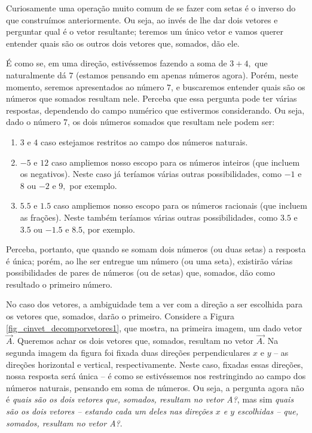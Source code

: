 Curiosamente uma operação muito comum de se fazer com setas é o inverso do que construímos anteriormente. Ou seja, ao invés de lhe dar dois vetores e perguntar qual é o vetor resultante; teremos um único vetor e vamos querer entender quais são os outros dois vetores que, somados, dão ele.

É como se, em uma direção, estivéssemos fazendo a soma de $3+4,$ que naturalmente dá $7$ (estamos pensando em apenas números agora). Porém, neste momento, seremos apresentados ao número $7$, e buscaremos entender quais são os números que somados resultam nele. Perceba que essa pergunta pode ter várias respostas, dependendo do campo numérico que estivermos considerando. Ou seja, dado o número $7$, os dois números somados que resultam nele podem ser:

\begin{enumerate}
    \item [(i)] $3$ e $4$ caso estejamos restritos ao campo dos números naturais.
    \item [(ii)] $-5$ e $12$ caso ampliemos nosso escopo para os números inteiros (que incluem os negativos). Neste caso já teríamos várias outras possibilidades, como $-1$ e $8$ ou $-2$ e $9,$ por exemplo.
    \item [(iii)] $5.5$ e $1.5$ caso ampliemos nosso escopo para os números racionais (que incluem as frações). Neste também teríamos várias outras possibilidades, como $3.5$ e $3.5$ ou $-1.5$ e $8.5$, por exemplo.
\end{enumerate}

Perceba, portanto, que quando se somam dois números (ou duas setas) a resposta é única; porém, ao lhe ser entregue um número (ou uma seta), existirão várias possibilidades de pares de números (ou de setas) que, somados, dão como resultado o primeiro número.

No caso dos vetores, a ambiguidade tem a ver com a direção a ser escolhida para os vetores que, somados, darão o primeiro. Considere a Figura \ref{fig_cinvet_decomporvetores1}, que mostra, na primeira imagem, um dado vetor $\vec{A}.$ Queremos achar os dois vetores que, somados, resultam no vetor $\vec{A.}$ Na segunda imagem da figura foi fixada duas direções perpendiculares $x$ e $y$ -- as direções horizontal e vertical, respectivamente. Neste caso, fixadas essas direções, nossa resposta será única -- é como se estivéssemos nos restringindo ao campo dos números naturais, pensando em soma de números. Ou seja, a pergunta agora não é \textit{quais são os dois vetores que, somados, resultam no vetor A?}, mas sim \textit{quais são os dois vetores -- estando cada um deles nas direções $x$ e $y$ escolhidas -- que, somados, resultam no vetor A?}.



